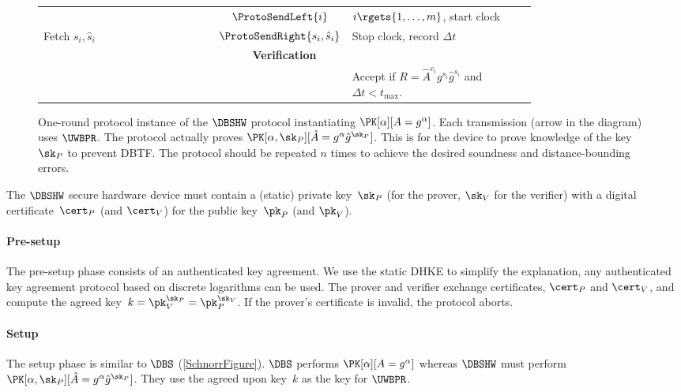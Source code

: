 \begin{figure*}
\begin{tabular}{p{0.40\linewidth}cp{0.40\linewidth}}
    & \(\ProtoSendLeft{i}\)
    & \(i\rgets \{1, \dotsc, m\}\), start clock
    \\

    Fetch \(s_i, \hat s_i\)
    & \(\ProtoSendRight{s_i, \hat s_i}\)
    & Stop clock, record \(\Delta t\)
    \\

    \midrule
    \multicolumn{3}{c}{\textbf{Verification}}
    \\

    &
    & Accept if \(R =  \hat A^{c_i} g^{s_i} \hat g^{\hat s_i}\) and \(\Delta t 
      < t_{\max}\).
    \\
    
  \end{tabular}
  \caption{%
    One-round protocol instance of the \(\DBSHW\) protocol instantiating 
    \(\PK[\alpha][A = g^\alpha]\).
    Each transmission (arrow in the diagram) uses \(\UWBPR\).
    The protocol actually proves \(\PK[\alpha, \sk_P][\hat A = g^\alpha 
      \hat g^{\sk_P}]\).
    This is for the device to prove knowledge of the key~\(\sk_P\) to prevent 
    \ac{DBTF}.
    The protocol should be repeated \(n\) times to achieve the desired 
    soundness and distance-bounding errors.
  }%
  \label{DBSHW-overview}
\end{figure*}

The \(\DBSHW\) secure hardware device must contain a (static) private 
key~\(\sk_P\) (for the prover, \(\sk_V\) for the verifier) with a digital 
certificate~\(\cert_P\) (and \(\cert_V\)) for the public key~\(\pk_P\) (and 
\(\pk_V\)).

\paragraph*{Pre-setup}

The pre-setup phase consists of an authenticated key agreement.
We use the static \ac{DHKE} to simplify the explanation, any authenticated key 
agreement protocol based on discrete logarithms can be used.
The prover and verifier exchange certificates, \(\cert_P\) and \(\cert_V\), and 
compute the agreed key~\(k = \pk_V^{\sk_P} = \pk_P^{\sk_V}\).
If the prover's certificate is invalid, the protocol aborts.

\paragraph*{Setup}

The setup phase is similar to \(\DBS\) (\cref{SchnorrFigure}).
\(\DBS\) performs \(\PK[\alpha][A = g^\alpha]\) whereas \(\DBSHW\) must perform 
\(\PK[\alpha, \sk_P][\hat A = g^\alpha \hat g^{\sk_P}]\).
They use the agreed upon key~\(k\) as the key for \(\UWBPR\).

